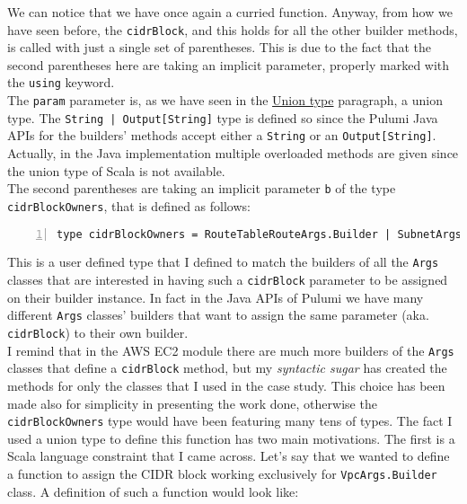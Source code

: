 We can notice that we have once again a curried function.
Anyway, from how we have seen before, the \texttt{cidrBlock}, and this holds for all the other builder methods, is called with just a single set of parentheses.
This is due to the fact that the second parentheses here are taking an implicit parameter, properly marked with the \texttt{using} keyword.\\
The \texttt{param} parameter is, as we have seen in the \hyperref[sssec:union]{Union type} paragraph, a union type.
The \texttt{String | Output[String]} type is defined so since the Pulumi Java APIs for the builders' methods accept either a \texttt{String} or an \texttt{Output[String]}.
Actually, in the Java implementation multiple overloaded methods are given since the union type of Scala is not available.\\
The second parentheses are taking an implicit parameter \texttt{b} of the type \texttt{cidrBlockOwners}, that is defined as follows:\\
\begin{minipage}{\linewidth}
\begin{lstlisting}[numbers=left, numberstyle=\tiny, numbersep=-5pt, stepnumber=1, linewidth=420pt]
  type cidrBlockOwners = RouteTableRouteArgs.Builder | SubnetArgs.Builder | VpcArgs.Builder
\end{lstlisting}
\end{minipage}
This is a user defined type that I defined to match the builders of all the \texttt{Args} classes that are interested in having such a \texttt{cidrBlock} parameter to be assigned on their builder instance.
In fact in the Java APIs of Pulumi we have many different \texttt{Args} classes' builders that want to assign the same parameter (aka. \texttt{cidrBlock}) to their own builder.\\
I remind that in the AWS EC2 module there are much more builders of the \texttt{Args} classes that define a \texttt{cidrBlock} method, but my \textit{syntactic sugar} has created the methods for only the classes that I used in the case study.
This choice has been made also for simplicity in presenting the work done, otherwise the \texttt{cidrBlockOwners} type would have been featuring many tens of types.
The fact I used a union type to define this function has two main motivations.
The first is a Scala language constraint that I came across.
Let's say that we wanted to define a function to assign the CIDR block working exclusively for \texttt{VpcArgs.Builder} class.
A definition of such a function would look like:\\

